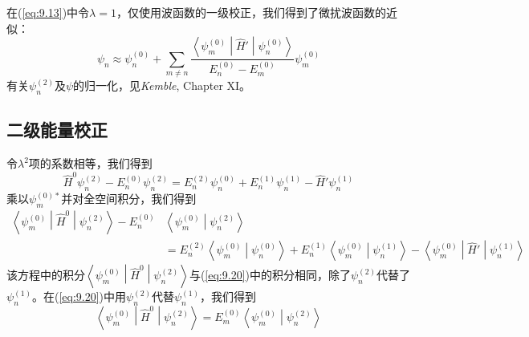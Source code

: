     在(\ref{eq:9.13})中令$\lambda=1$，仅使用波函数的一级校正，我们得到了微扰波函数的近似：
    \begin{equation}
        \psi_n \approx \psi_n^{\left(0\right)} + \sum_{m \neq n} \frac{\left\langle \psi_m^{\left(0\right)} \middle| \hat{H}' \middle| \psi_n^{\left(0\right)} \right\rangle}{E_n^{\left(0\right)} - E_m^{\left(0\right)}} \psi_m^{\left(0\right)}
        \label{eq:9.28}
    \end{equation}
    有关$\psi_n^{\left(2\right)}$及$\psi$的归一化，见\textit{Kemble}, Chapter XI。

\subsection*{二级能量校正}

    令$\lambda^2$项的系数相等，我们得到
    \begin{equation}
        \hat{H}^0\psi_n^{\left(2\right)} - E_n^{\left(0\right)} \psi_n^{\left(2\right)} = E_n^{\left(2\right)} \psi_n^{\left(0\right)} + E_n^{\left(1\right)} \psi_n^{\left(1\right)} - \hat{H}' \psi_n^{\left(1\right)}
        \label{eq:9.29}
    \end{equation}
    乘以$\psi_m^{\left(0\right)\ast}$并对全空间积分，我们得到
    \begin{equation}
        \begin{aligned}
            \left\langle \psi_m^{\left(0\right)} \middle| \hat{H}^0 \middle| \psi_n^{\left(2\right)} \right\rangle - E_n^{\left(0\right)}& \left\langle \psi_m^{\left(0\right)} \middle| \psi_n^{\left(2\right)} \right\rangle \\
            &= E_n^{\left(2\right)} \left\langle \psi_m^{\left(0\right)} \middle| \psi_n^{\left(0\right)} \right\rangle + E_n^{\left(1\right)} \left\langle \psi_m^{\left(0\right)} \middle| \psi_n^{\left(1\right)} \right\rangle - \left\langle \psi_m^{\left(0\right)} \middle| \hat{H}' \middle| \psi_n^{\left(1\right)} \right\rangle
        \end{aligned}
        \label{eq:9.30}
    \end{equation}
    该方程中的积分$\left\langle \psi_m^{\left(0\right)} \middle| \hat{H}^0 \middle| \psi_n^{\left(2\right)} \right\rangle$与(\ref{eq:9.20})中的积分相同，除了$\psi_n^{\left(2\right)}$代替了$\psi_n^{\left(1\right)}$。在(\ref{eq:9.20})中用$\psi_n^{\left(2\right)}$代替$\psi_n^{\left(1\right)}$，我们得到
    \begin{equation}
        \left\langle \psi_m^{\left(0\right)} \middle| \hat{H}^0 \middle| \psi_n^{\left(2\right)} \right\rangle = E_m^{\left(0\right)} \left\langle \psi_m^{\left(0\right)} \middle| \psi_n^{\left(2\right)} \right\rangle
        \label{eq:9.31}
    \end{equation}
